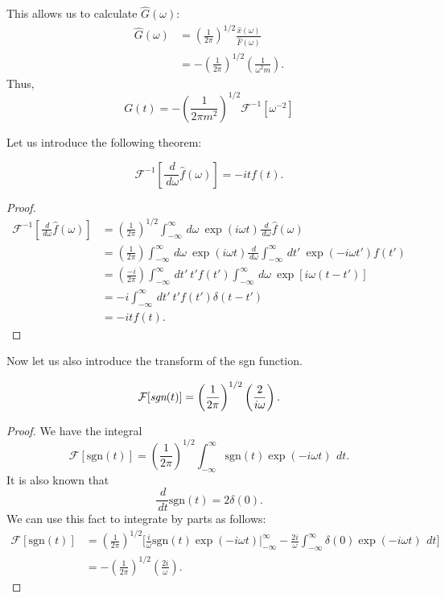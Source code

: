 \documentclass[12pt]{article}
\newcommand{\diff}{\,\textit{d}}
\begin{document}
This allows us to calculate $\hat{G}(\omega) :$
\begin{align*}
	\hat{G}(\omega) &= \left(\frac{1}{2\pi}\right)^{1/2}\frac{\hat{x}(\omega)}{\hat{F}(\omega)} \\
			&= -\left(\frac{1}{2\pi}\right)^{1/2} \left(\frac{1}{\omega^2 m}\right).
\end{align*}
Thus, 
\[
	G(t) = -\left( \frac{1}{2\pi m^2} \right)^{1/2} \mathcal{F}^{-1}\left[ \omega^{-2} \right]
\] 

Let us introduce the following theorem: 
\begin{theorem}
	\[
		\mathcal{F}^{-1}\left[ \frac{\diff }{\diff \omega}\hat{f}(\omega) \right] = -i t f(t).
	\]
	
\end{theorem}
\begin{proof}
	\begin{align*}
		\mathcal{F}^{-1}\left[ \frac{\diff}{\diff \omega}\hat{f}(\omega) \right] &= \left( \frac{1}{2\pi} \right)^{1/2} \int_{-\infty}^{\infty} \diff \omega \ \exp(i\omega t)\frac{\diff }{\diff \omega}\hat{f}(\omega) \\
											 &= \left( \frac{1}{2\pi} \right)\int_{-\infty}^{\infty} \diff \omega \ \exp(i\omega t) \frac{\diff }{\diff \omega}\int_{-\infty}^{\infty} \diff t' \ \exp(-i\omega t')f(t') \\
											 &= \left( \frac{-i}{2\pi} \right)\int_{-\infty} ^{\infty} \diff t' \ t' f(t') \int_{-\infty}^{\infty} \diff \omega \ \exp \left[ i \omega(t-t') \right] \\
											&=  -i\int_{-\infty}^{\infty} \diff t' \ t'f(t')\delta(t-t') \\
											 &= -itf(t).
	\end{align*}
\end{proof}

Now let us also introduce the transform of the sgn function. 
\begin{theorem}
	\[
		\mathcal{F}[\emph{sgn}(t)] = \left( \frac{1}{2\pi} \right)^{1/2} \left( \frac{2}{i\omega} \right).
	\]
	
\end{theorem}
\begin{proof}
	We have the integral
	\[
		\mathcal{F} [ \text{sgn}(t) ] = \left( \frac{1}{2\pi} \right)^{1/2} \int_{-\infty}^{\infty} \text{sgn}(t)\exp(-i\omega t)\ \diff t. 
	\]
	It is also known that
	\[
		\frac{\diff}{\diff t}\text{sgn}(t) = 2\delta(0).
	\]
	We can use this fact to integrate by parts as follows:
	\begin{align*}
		\mathcal{F}[\text{sgn}(t)] &= \left( \frac{1}{2\pi} \right)^{1/2} \bigg[ \frac{i}{\omega} \text{sgn}(t) \exp(-i\omega t)\big|_{-\infty}^{\infty} - \frac{2i}{\omega} \int_{-\infty}^{\infty} \delta(0) \exp(-i \omega t)\ \diff t \bigg] \\
					   &= -\left( \frac{1}{2\pi} \right)^{1/2} \left( \frac{2i}{\omega} \right).
	\end{align*}
	
\end{proof}
\end{document}
